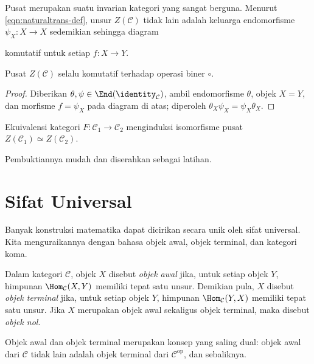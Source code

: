 Pusat merupakan suatu invarian kategori yang sangat berguna. Menurut \eqref{eqn:naturaltrans-def}, unsur $Z(\mathcal{C})$ tidak lain adalah keluarga endomorfisme $\psi_X: X \to X$ sedemikian sehingga diagram
komutatif untuk setiap $f: X \to Y$.

\begin{proposition}
	Pusat $Z(\mathcal{C})$ selalu komutatif terhadap operasi biner $\circ$.
\end{proposition}
\begin{proof}
	Diberikan $\theta, \psi \in \End(\identity_{\mathcal{C}})$, ambil endomorfisme $\theta$, objek $X=Y$, dan morfisme $f = \psi_X$ pada diagram di atas; diperoleh $\theta_X \psi_X = \psi_X \theta_X$.
\end{proof}

\begin{proposition}
	Ekuivalensi kategori $F: \mathcal{C}_1 \to \mathcal{C}_2$ menginduksi isomorfisme pusat $Z(\mathcal{C}_1) \simeq Z(\mathcal{C}_2)$.
\end{proposition}
Pembuktiannya mudah dan diserahkan sebagai latihan.

\section{Sifat Universal}\label{sec:cat-universals}
Banyak konstruksi matematika dapat dicirikan secara unik oleh sifat universal. Kita menguraikannya dengan bahasa objek awal, objek terminal, dan kategori koma.

\begin{definition}\label{def:universal-objects}
	Dalam kategori $\mathcal{C}$, objek $X$ disebut \emph{objek awal} jika, untuk setiap objek $Y$, himpunan $\Hom_{\mathcal{C}}(X, Y)$ memiliki tepat satu unsur. Demikian pula, $X$ disebut \emph{objek terminal} jika, untuk setiap objek $Y$, himpunan $\Hom_{\mathcal{C}}(Y, X)$ memiliki tepat satu unsur. Jika $X$ merupakan objek awal sekaligus objek terminal, maka disebut \emph{objek nol}.
\end{definition}

Objek awal dan objek terminal merupakan konsep yang saling dual: objek awal dari $\mathcal{C}$ tidak lain adalah objek terminal dari $\mathcal{C}^\text{op}$, dan sebaliknya.

